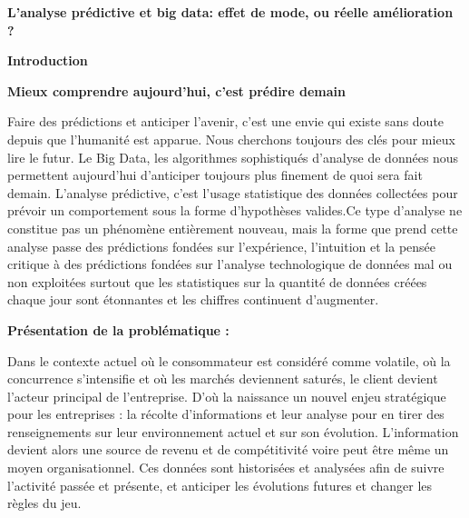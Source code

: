\documentclass{article}
\begin{document}
\begin{center}
{\Large \textbf{L’analyse prédictive et big data: effet de mode, ou réelle amélioration ?}}
\end{center}
\vspace{0.5cm}

\begin{center}
\textbf{Introduction}
\end{center}

\vspace{0.5cm}
\textbf{Mieux comprendre aujourd’hui, c’est prédire demain}
\vspace{0.5cm}

Faire des prédictions et anticiper l’avenir, c’est une envie qui existe sans doute depuis que l’humanité est apparue. Nous cherchons toujours des clés pour mieux lire le futur. Le Big Data, les algorithmes sophistiqués d’analyse de données nous permettent aujourd’hui d’anticiper toujours plus finement de quoi sera fait demain. 
L’analyse prédictive, c’est l’usage statistique des données collectées pour prévoir un comportement sous la forme d’hypothèses valides.Ce type d’analyse ne constitue pas un phénomène entièrement nouveau, mais la forme que prend cette analyse passe des prédictions fondées sur l’expérience, l’intuition et la pensée critique à des prédictions fondées sur l’analyse technologique de données mal ou non exploitées surtout que les statistiques sur la quantité de données créées chaque jour sont étonnantes et les chiffres continuent d’augmenter.
\vspace{0.5cm}

\textbf{Présentation de la problématique :}

\vspace{0.5cm}
Dans le contexte actuel où le consommateur est considéré comme volatile, où la concurrence s’intensifie et où les marchés deviennent saturés, le client devient l’acteur principal de l’entreprise. D’où la naissance un nouvel enjeu stratégique pour les entreprises : la récolte d’informations et leur analyse pour en tirer des renseignements sur leur environnement actuel et sur son évolution. L’information devient alors une source de revenu et de compétitivité voire peut être même un moyen organisationnel. Ces données sont historisées et analysées afin de suivre l’activité passée et présente, et anticiper les évolutions futures et changer les règles du jeu.
\end{document}

